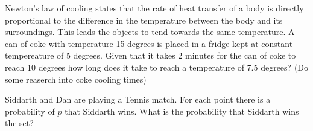 \item
Newton's law of cooling states that the rate of heat transfer of a body is directly proportional to the difference in the temperature between the body and its surroundings. This leads the objects to tend towards the same temperature. A can of coke with 
temperature 15 degrees is placed in a fridge kept at constant tempereature of 5 degrees. Given that it takes 2 minutes for the can of coke to reach 10 degrees how long does it take to reach a temperature of 7.5 degrees? (Do some reaserch into coke cooling times)

\item
Siddarth and Dan are playing a Tennis match. For each point there is a probability of $p$ that Siddarth wins. What is the probability that Siddarth wins the set?
